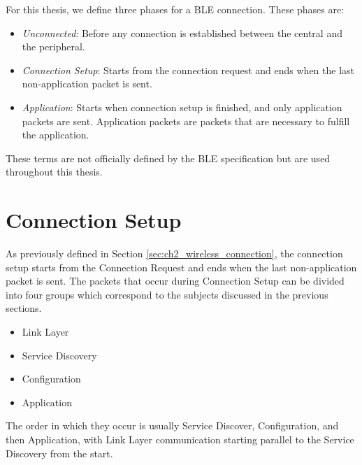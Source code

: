 For this thesis, we define three phases for a BLE connection. These phases are:
\begin{itemize}
    \item \textit{Unconnected}: Before any connection is established between the central and the peripheral.
    \item \textit{Connection Setup}: Starts from the connection request and ends when the last non-application packet is sent. 
    \item \textit{Application}: Starts when connection setup is finished, and only application packets are sent. Application packets are packets that are necessary to fulfill the application. 
\end{itemize}
These terms are not officially defined by the BLE specification but are used throughout this thesis. 

\section{Connection Setup}
As previously defined in Section \ref{sec:ch2_wireless_connection}, the connection setup starts from the Connection Request and ends when the last non-application packet is sent. The packets that occur during Connection Setup can be divided into four groups which correspond to the subjects discussed in the previous sections.
\begin{itemize}
    \item Link Layer
    \item Service Discovery
    \item Configuration
    \item Application
\end{itemize} 
The order in which they occur is usually Service Discover, Configuration, and then Application, with Link Layer communication starting parallel to the Service Discovery from the start.

